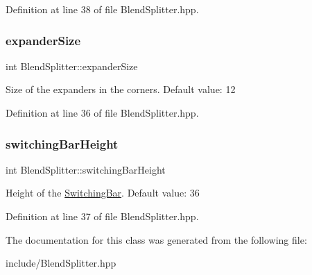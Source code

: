 Definition at line 38 of file Blend\+Splitter.\+hpp.

\hypertarget{class_blend_splitter_a233a45efce9417f826d76ce54d832d50}{}\label{class_blend_splitter_a233a45efce9417f826d76ce54d832d50} 
\subsubsection{\texorpdfstring{expander\+Size}{expanderSize}}
{\footnotesize\ttfamily int Blend\+Splitter\+::expander\+Size\hspace{0.3cm}{\ttfamily [static]}}

Size of the expanders in the corners. Default value\+: 12 

Definition at line 36 of file Blend\+Splitter.\+hpp.

\hypertarget{class_blend_splitter_a478fa3cfcf59f76edf8f021bee297e0d}{}\label{class_blend_splitter_a478fa3cfcf59f76edf8f021bee297e0d} 
\subsubsection{\texorpdfstring{switching\+Bar\+Height}{switchingBarHeight}}
{\footnotesize\ttfamily int Blend\+Splitter\+::switching\+Bar\+Height\hspace{0.3cm}{\ttfamily [static]}}

Height of the \hyperlink{class_switching_bar}{Switching\+Bar}. Default value\+: 36 

Definition at line 37 of file Blend\+Splitter.\+hpp.



The documentation for this class was generated from the following file\+:\begin{DoxyCompactItemize}
\item 
include/Blend\+Splitter.\+hpp\end{DoxyCompactItemize}
